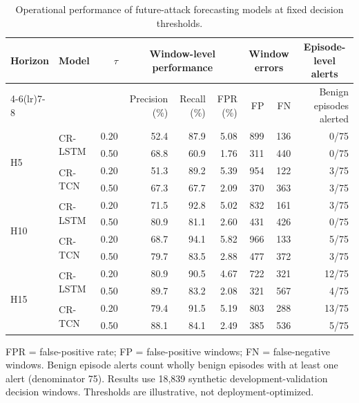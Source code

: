 \begin{table}[t]
\centering
\caption{Operational performance of future-attack forecasting models at fixed decision thresholds.}
\label{tab:operational_forecasting}
\small
\begin{tabular}{llrrrrrrr}
\toprule
\multirow{2}{*}{Horizon} & \multirow{2}{*}{Model} & \multirow{2}{*}{$\tau$} & \multicolumn{3}{c}{Window-level performance} & \multicolumn{2}{c}{Window errors} & \multicolumn{1}{c}{Episode-level alerts} \\
\cmidrule(lr){4-6}\cmidrule(lr){7-8}
 & & & Precision (\%) & Recall (\%) & FPR (\%) & FP & FN & Benign episodes alerted \\
\midrule
\multirow{4}{*}{H5} & \multirow{2}{*}{CR-LSTM} & 0.20 & 52.4 & 87.9 & 5.08 & 899 & 136 & 0/75 \\
 &  & 0.50 & 68.8 & 60.9 & 1.76 & 311 & 440 & 0/75 \\
\cmidrule(lr){2-9}
 & \multirow{2}{*}{CR-TCN} & 0.20 & 51.3 & 89.2 & 5.39 & 954 & 122 & 3/75 \\
 &  & 0.50 & 67.3 & 67.7 & 2.09 & 370 & 363 & 3/75 \\
\midrule
\multirow{4}{*}{H10} & \multirow{2}{*}{CR-LSTM} & 0.20 & 71.5 & 92.8 & 5.02 & 832 & 161 & 3/75 \\
 &  & 0.50 & 80.9 & 81.1 & 2.60 & 431 & 426 & 0/75 \\
\cmidrule(lr){2-9}
 & \multirow{2}{*}{CR-TCN} & 0.20 & 68.7 & 94.1 & 5.82 & 966 & 133 & 5/75 \\
 &  & 0.50 & 79.7 & 83.5 & 2.88 & 477 & 372 & 3/75 \\
\midrule
\multirow{4}{*}{H15} & \multirow{2}{*}{CR-LSTM} & 0.20 & 80.9 & 90.5 & 4.67 & 722 & 321 & 12/75 \\
 &  & 0.50 & 89.7 & 83.2 & 2.08 & 321 & 567 & 4/75 \\
\cmidrule(lr){2-9}
 & \multirow{2}{*}{CR-TCN} & 0.20 & 79.4 & 91.5 & 5.19 & 803 & 288 & 13/75 \\
 &  & 0.50 & 88.1 & 84.1 & 2.49 & 385 & 536 & 5/75 \\
\bottomrule
\end{tabular}
\vspace{2pt}
\parbox{\textwidth}{\footnotesize FPR = false-positive rate; FP = false-positive windows; FN = false-negative windows. Benign episode alerts count wholly benign episodes with at least one alert (denominator 75). Results use 18,839 synthetic development-validation decision windows. Thresholds are illustrative, not deployment-optimized.}
\end{table}

